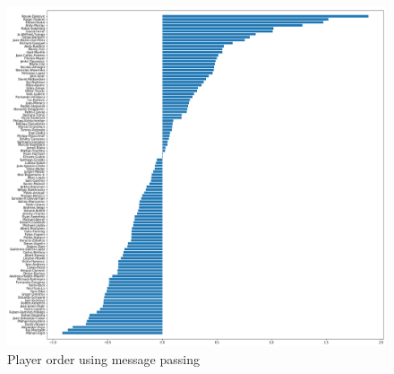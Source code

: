\documentclass[twoside,twocolumn]{article}
\begin{document}
\begin{figure}[h]
  \centering
    \includegraphics[width=\linewidth]{e_3}
  \caption{Player order using message passing}
  \label{fig:e_3}
\end{figure}
\end{document}
